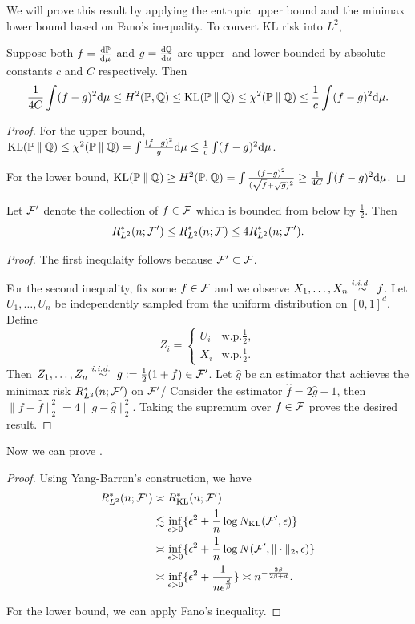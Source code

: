 We will prove this result by applying the entropic upper bound and the minimax lower bound based on Fano's inequality.
To convert KL risk into $L^2$,
\begin{lemma}
    Suppose both $f=\frac{\mathrm{d}\mathbb{P}}{\mathrm{d}\mu}$ and $g=\frac{\mathrm{d}\mathbb{Q}}{\mathrm{d}\mu}$ are upper- and lower-bounded by absolute constants $c$ and $C$ respectively.
    Then
    \[\frac{1}{4C}\int (f-g)^2\mathrm{d}\mu\leq H^2(\mathbb{P},\mathbb{Q})\leq \operatorname{KL}(\mathbb{P}\mathbin{\|}\mathbb{Q})\leq \chi^2(\mathbb{P}\mathbin{\|}\mathbb{Q})\leq \frac{1}{c}\int (f-g)^2\mathrm{d}\mu.\]
\end{lemma}
\begin{proof}
    For the upper bound, $\operatorname{KL}(\mathbb{P}\mathbin{\|}\mathbb{Q})\leq \chi^2(\mathbb{P}\mathbin{\|}\mathbb{Q})=\int\frac{(f-g)^2}{g}\mathrm{d}\mu\leq \frac{1}{c}\int (f-g)^2 \mathrm{d}\mu$.
    
    For the lower bound, $\operatorname{KL}(\mathbb{P}\mathbin{\|}\mathbb{Q})\geq H^2(\mathbb{P},\mathbb{Q})=\int \frac{(f-g)^2}{(\sqrt{f}+\sqrt{g})^2}\geq \frac{1}{4C}\int (f-g)^2\mathrm{d}\mu$.
\end{proof}

\begin{lemma}
    Let $\mathcal{F}'$ denote the collection of $f\in\mathcal{F}$ which is bounded from below by $\frac{1}{2}$. Then 
    \[R^*_{L^2}(n;\mathcal{F}')\leq R^*_{L^2}(n;\mathcal{F})\leq 4R^*_{L^2}(n;\mathcal{F}').\]
\end{lemma}
\begin{proof}
    The first inequlaity follows because $\mathcal{F}'\subset\mathcal{F}$.

    For the second inequality, fix some $f\in\mathcal{F}$ and we observe $X_1,\dots,X_n\stackrel{\textit{i.i.d.~}}{\sim} f$.
    Let $U_1,\dots,U_n$ be independently sampled from the uniform distribution on $[0,1]^d$.
    Define 
    \[Z_i=\begin{cases}
        U_i & \text{w.p.}\frac{1}{2},\\
        X_i & \text{w.p.}\frac{1}{2}.
    \end{cases}\]
    Then $Z_1,\dots,Z_n \stackrel{\textit{i.i.d.~}}{\sim} g:=\frac{1}{2}(1+f)\in\mathcal{F}'$. 
    Let $\hat{g}$ be an estimator that achieves the minimax risk $R^*_{L^2}(n;\mathcal{F}')$ on $\mathcal{F}'$/
    Consider the estimator $\hat{f}=2\hat{g}-1$, then $\|f-\hat{f}\|_2^2=4\|g-\hat{g}\|_2^2$.
    Taking the supremum over $f\in\mathcal{F}$ proves the desired result.
\end{proof}

Now we can prove .
\begin{proof}
    Using Yang-Barron's construction, we have
    \begin{align*}
        R^*_{L^2}(n;\mathcal{F}')&\asymp R^*_{\operatorname{KL}}(n;\mathcal{F}')\\
        &\lesssim \inf_{\epsilon>0}\{\epsilon^2+\frac{1}{n}\log N_{\operatorname{KL}}(\mathcal{F}',\epsilon)\}\\
        &\asymp \inf_{\epsilon>0}\{\epsilon^2+\frac{1}{n}\log N(\mathcal{F}',\|\cdot\|_2,\epsilon)\}\\
        &\asymp \inf_{\epsilon>0}\{\epsilon^2+\frac{1}{n\epsilon^{\frac{d}{\beta}}}\}\asymp n^{-\frac{2\beta}{2\beta+d}}.
    \end{align*}

    For the lower bound, we can apply Fano's inequality.
\end{proof}

